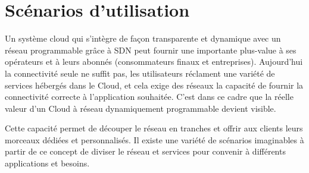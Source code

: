 
\section{Scénarios d'utilisation}

Un système cloud qui s'intègre de façon transparente et dynamique avec un réseau programmable grâce à SDN peut fournir une importante plus-value à ses opérateurs et à leurs abonnés (consommateurs finaux et entreprises). Aujourd'hui la connectivité seule ne suffit pas, les utilisateurs réclament une variété de services hébergés dans le Cloud, et cela exige des réseaux la capacité de fournir la connectivité correcte à l'application souhaitée. C'est dans ce cadre que  la réelle valeur d'un Cloud à réseau dynamiquement programmable  devient visible.

Cette capacité permet de découper le réseau en tranches et offrir aux clients leurs morceaux dédiées et personnalisés. Il existe une variété de scénarios imaginables  à partir de ce concept de diviser le réseau et services pour convenir à différents applications et besoins.

